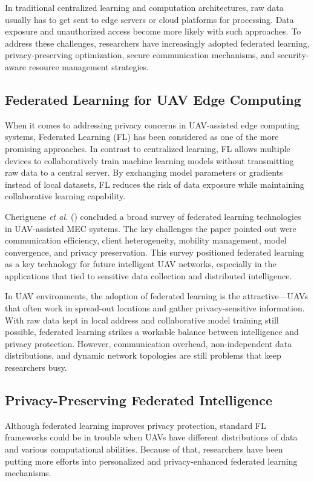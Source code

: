 \documentclass[a4paper, 12pt]{article}
\begin{document}
In traditional centralized learning and computation architectures, raw data usually has to get sent to edge servers or cloud platforms for processing. Data exposure and unauthorized access become more likely with such approaches. To address these challenges, researchers have increasingly adopted federated learning, privacy-preserving optimization, secure communication mechanisms, and security-aware resource management strategies.

\subsection*{Federated Learning for UAV Edge Computing}
When it comes to addressing privacy concerns in UAV-assisted edge computing systems, Federated Learning (FL) has been considered as one of the more promising approaches. In contrast to centralized learning, FL allows multiple devices to collaboratively train machine learning models without transmitting raw data to a central server. By exchanging model parameters or gradients instead of local datasets, FL reduces the risk of data exposure while maintaining collaborative learning capability.

Cheriguene \textit{et al.} (\cite{Cheriguene2025}) concluded a broad survey of federated learning technologies in UAV-assisted MEC systems. The key challenges the paper pointed out were communication efficiency, client heterogeneity, mobility management, model convergence, and privacy preservation. This survey positioned federated learning as a key technology for future intelligent UAV networks, especially in the applications that tied to sensitive data collection and distributed intelligence.

In UAV environments, the adoption of federated learning is the attractive—UAVs that often work in spread-out locations and gather privacy-sensitive information. With raw data kept in local address and collaborative model training still possible, federated learning strikes a workable balance between intelligence and privacy protection. However, communication overhead, non-independent data distributions, and dynamic network topologies are still problems that keep researchers busy.

\subsection*{Privacy-Preserving Federated Intelligence}
Although federated learning improves privacy protection, standard FL frameworks could be in trouble when UAVs have different distributions of data and various computational abilities. Because of that, researchers have been putting more efforts into personalized and privacy-enhanced federated learning mechanisms.
\end{document}
